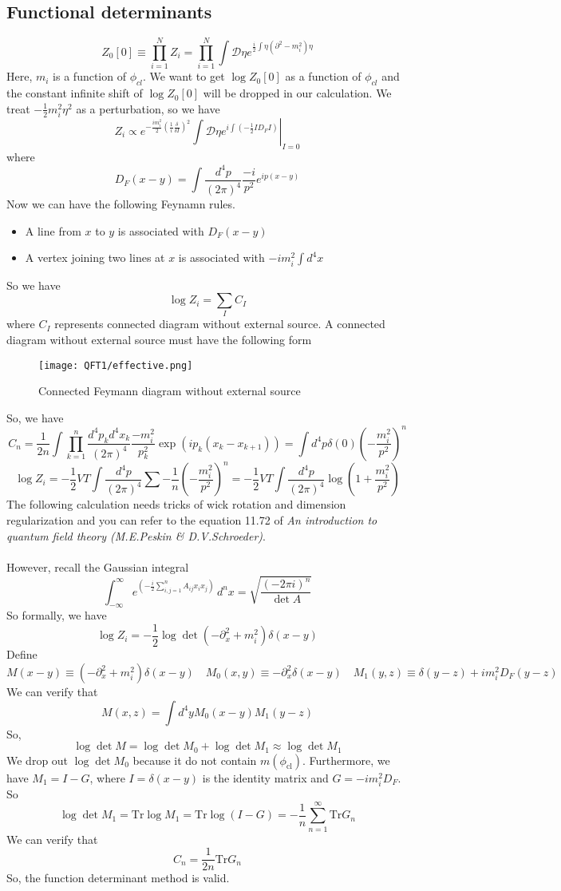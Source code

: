 \subsection{Functional determinants}
\[Z_0[0] \equiv \prod_{i=1}^{N} Z_i  = \prod_{i=1}^{N} \int \mathcal{D}\eta e^{ \frac{i}{2}\int \eta \left( \partial^2-m_i^2\right) \eta }\]
Here, $m_i$ is a function of $\phi_{cl}$. We want to get $\log Z_0[0]$ as a function of $\phi_{cl}$ and the constant infinite shift of $\log Z_0[0]$ will be dropped in our calculation. We treat $-\frac{1}{2}m_i^2\eta^2$ as a perturbation, so we have
\[Z_i \propto e^{-\frac{im_i^2}{2}(\frac{1}{i} \frac{\delta}{\delta I})^2} \left. \int \mathcal{D}\eta e^{i\int \left(-\frac{1}{2} I D_F I \right)} \right|_{I=0}\] 
where
\[D_F(x-y) = \int \frac{d^4p}{(2\pi)^4} \frac{-i}{p^2}e^{ip(x-y)}\]
Now we can have the following Feynamn rules.
\begin{itemize}
\item A line from $x$ to $y$ is associated with $D_F(x-y)$
\item A vertex joining two lines at $x$ is associated with $-im_i^2\int d^4x$
\end{itemize}
So we have
\[\log Z_i = \sum_{I}C_I\]
where $C_I$ represents connected diagram without external source.
A connected diagram without external source must have the following form

\begin{figure}[!h]
\centering
\texttt{[image: QFT1/effective.png]}
\caption{Connected Feymann diagram without external source}
\end{figure}

\noindent
So, we have
\[C_n = \frac{1}{2n}\int \prod_{k=1}^{n} \frac{d^4p_k d^4x_k}{(2\pi)^4} \frac{-m_i^2}{p_k^2} \exp(ip_k(x_k-x_{k+1})) = \int d^4p \delta(0) \left(-\frac{m_i^2}{p^2} \right)^n\]
\[\log Z_i = -\frac{1}{2}VT \int \frac{d^4p}{(2\pi)^4} \sum -\frac{1}{n} \left(-\frac{m_i^2}{p^2} \right)^n = -\frac{1}{2}VT\int  \frac{d^4p}{(2\pi)^4} \log(1+\frac{m_i^2}{p^2})\]
The following calculation needs tricks of wick rotation and dimension regularization and you can refer to the equation 11.72 of \emph{An introduction to quantum field theory (M.E.Peskin \& D.V.Schroeder)}.\\ \\
However, recall the Gaussian integral
\[\int _{-\infty }^{\infty }e^{\left(-{\frac {i}{2}}\sum \limits _{i,j=1}^{n}A_{ij}x_{i}x_{j}\right)}\,d^{n}x
= {\sqrt {\frac {(-2\pi i)^{n}}{\det A}}} \]
So formally, we have
\[\log Z_i = -\frac{1}{2}\log \det (-\partial_x^2 + m_i^2)\delta(x-y)\]
Define
\[M(x-y) \equiv (-\partial_x^2 + m_i^2)\delta(x-y) \quad M_0(x,y) \equiv -\partial_x^2\delta(x-y) \quad M_1(y,z) \equiv \delta(y-z) + im_i^2D_F(y-z)\]
We can verify that
\[M(x,z) = \int d^4y M_0(x-y)M_1(y-z)\]
So, 
\[\log \det M = \log \det M_0 + \log \det M_1 \approx \log \det M_1\]
We drop out $\log \det M_0$ because it do not contain $m(\phi_{\mathrm{cl}})$. Furthermore, we have $M_1 = I - G$, where $I = \delta(x-y)$ is the identity matrix and $G = -im_i^2D_F$. So
\[\log \det M_1 =  \mathrm{Tr} \log M_1 = \mathrm{Tr} \log(I-G) = -\frac{1}{n}\sum_{n=1}^{\infty} \mathrm{Tr} G_n\]
We can verify that
\[C_n = \frac{1}{2n} \mathrm{Tr} G_n\]
So, the function determinant method is valid.

